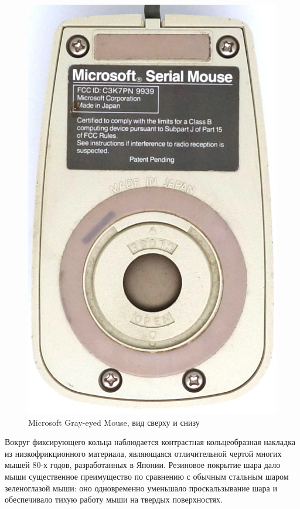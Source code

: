 \documentclass[11pt, a4paper]{article}
\begin{document}
\begin{figure}[h]
    \includegraphics[scale=0.55]{1985_microsoft_gray_eyed_mouse/bottom_30.jpg}
    \caption{Microsoft Gray-eyed Mouse, вид сверху и снизу}
    \label{fig:MicrosoftGrayEyedTopAndBottom}
\end{figure}

Вокруг фиксирующего кольца наблюдается контрастная кольцеобразная накладка из низкофрикционного материала, являющаяся отличительной чертой многих мышей 80-х годов, разработанных в Японии. Резиновое покрытие шара дало мыши существенное преимущество по сравнению с обычным стальным шаром зеленоглазой мыши: оно одновременно уменьшало проскальзывание шара и обеспечивало тихую работу мыши на твердых поверхностях.
\end{document}
